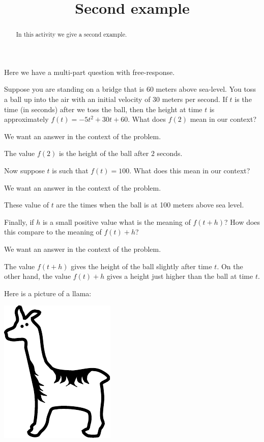 \documentclass{ximera}
\title{Second example}
\begin{document}
\begin{abstract}
In this activity we give a second example.
\end{abstract} 
\maketitle

Here we have a multi-part question with free-response.

\begin{question} 
Suppose you are standing on a bridge that is 60 meters above
sea-level. You toss a ball up into the air with an initial velocity of
30 meters per second.  If $t$ is the time (in seconds) after we toss
the ball, then the height at time $t$ is approximately $f(t) = -5 t^2
+30t+60$. What does $f(2)$ mean in our context?
\begin{hint}
We want an answer in the context of the problem. 
\end{hint}
\begin{freeResponse}
The value $f(2)$ is the height of the ball after $2$ seconds.
\end{freeResponse}
Now suppose $t$ is such that $f(t) = 100$. What does this mean in our
context?
\begin{hint}
We want an answer in the context of the problem. 
\end{hint}
\begin{freeResponse}
These value of $t$ are the times when the ball is at 100 meters above sea level.\end{freeResponse}
Finally, if $h$ is a small positive value what is the meaning of
$f(t+h)$? How does this compare to the meaning of $f(t)+h$?
\begin{hint}
We want an answer in the context of the problem. 
\end{hint}
\begin{freeResponse}
The value $f(t+h)$ gives the height of the ball slightly after time
$t$. On the other hand, the value $f(t)+h$ gives a height just higher
than the ball at time $t$.
\end{freeResponse}
\end{question}

Here is a picture of a llama:
\begin{image}
\includegraphics{llama.pdf}
\end{image}
\end{document}
